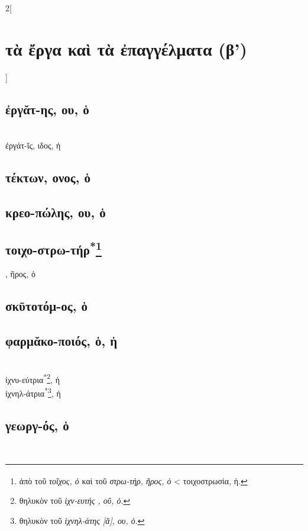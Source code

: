 \documentclass{book}
\begin{document}
\begin{multicols}{2}[\section{τὰ ἔργα καὶ τὰ ἐπαγγέλματα (β')}]
\subsection{ἐργᾰτ-ης, ου, ὁ}  ~\\
ἐργάτ-ῐς, ιδος, ἡ 
\subsection{τέκτων, ονος, ὁ}
\subsection{κρεο-πώλης, ου, ὁ}
\subsection{τοιχο-στρω-τήρ\textsuperscript{*}\protect\footnote{ἀπὸ τοῦ \emph{τοῖχος, ὁ} καὶ τοῦ \emph{στρω-τήρ, ῆρος, ὁ}
< τοιχοστρωσία\textsuperscript{\textdagger}, ἡ.}}, ῆρος, ὁ  
\subsection{σκῡτοτόμ-ος, ὁ}
\subsection{φαρμᾰκο-ποιός, ὁ, ἡ}  %
 ~\\
ἰχνυ-εύτρια\textsuperscript{*}\protect\footnote{θηλυκὸν τοῦ \emph{ἰχν-ευτής , οῦ, ὁ}.}, ἡ
 ~\\
ἰχνηλ-άτρια\textsuperscript{*}\protect\footnote{θηλυκὸν τοῦ \emph{ἰχνηλ-άτης [ᾰ], ου, ὁ}.},  ἡ
\subsection{γεωργ-ός, ὁ}
~
\end{multicols}
\end{document}

